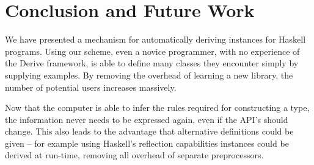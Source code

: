 \documentclass{llncs}
\begin{document}
\section{Conclusion and Future Work}

We have presented a mechanism for automatically deriving instances for Haskell programs. Using our scheme, even a novice programmer, with no experience of the Derive framework, is able to define many classes they encounter simply by supplying examples. By removing the overhead of learning a new library, the number of potential users increases massively.

Now that the computer is able to infer the rules required for constructing a type, the information never needs to be expressed again, even if the API's should change. This also leads to the advantage that alternative definitions could be given -- for example using Haskell's reflection capabilities instances could be derived at run-time, removing all overhead of separate preprocessors.
\end{document}
